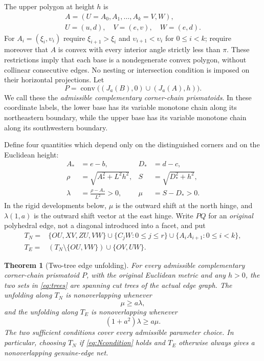 \documentclass[a4paper,11pt]{amsart}
\newtheorem{theorem}{Theorem}[section]
\begin{document}
The upper polygon at height $h$ is
\begin{equation}\label{eq:A}
\begin{gathered}
 A=(U=A_0,A_1,\ldots,A_k=V,W),\\
 U=(u,d),\quad V=(e,v),\quad W=(e,d).
\end{gathered}
\end{equation}
For $A_i=(\xi_i,\upsilon_i)$ require
$\xi_{i+1}>\xi_i$ and $\upsilon_{i+1}<\upsilon_i$ for $0\leq i<k$; require moreover that $A$ is convex with every interior angle strictly less than $\pi$. These restrictions imply that each base is a nondegenerate convex polygon, without collinear consecutive edges. No nesting or intersection condition is imposed on their horizontal projections. Let
\[
 P=\operatorname{conv}\bigl((J_a(B),0)\cup(J_a(A),h)\bigr).
\]
We call these the \emph{admissible complementary corner-chain prismatoids}.
In these coordinate labels, the lower base has its variable monotone chain along its northeastern boundary, while the upper base has its variable monotone chain along its southwestern boundary.

Define four quantities which depend only on the distinguished corners and on the Euclidean height:
\begin{align}\label{eq:parameters}
 A_*&=e-b,& D_*&=d-c,\\
 \rho&=\sqrt{A_*^2+L^2h^2},& S&=\sqrt{D_*^2+h^2},\\
 \lambda&=\frac{\rho-A_*}{L^2}>0,&
 \mu&=S-D_*>0.
\end{align}
In the rigid developments below, $\mu$ is the outward shift at the north hinge, and $\lambda(1,a)$ is the outward shift vector at the east hinge.
Write $PQ$ for an \emph{original} polyhedral edge, not a diagonal introduced into a facet, and put
\begin{align}\label{eq:trees}
 T_N={}&\{OU,XV,ZU,VW\}
 \cup\{C_jW:0\leq j\leq r\}
 \cup\{A_iA_{i+1}:0\leq i<k\},\\
 T_E={}&(T_N\setminus\{OU,VW\})\cup\{OV,UW\}.
\end{align}

\begin{theorem}[Two-tree edge unfolding]\label{thm:main}
For every admissible complementary corner-chain prismatoid $P$, with the original Euclidean metric and any $h>0$, the two sets in \eqref{eq:trees} are spanning cut trees of the actual edge graph. The unfolding along $T_N$ is nonoverlapping whenever
\begin{equation}\label{eq:Ncondition}
 \mu\geq a\lambda,
\end{equation}
and the unfolding along $T_E$ is nonoverlapping whenever
\begin{equation}\label{eq:Econdition}
 (1+a^2)\lambda\geq a\mu.
\end{equation}
The two sufficient conditions cover every admissible parameter choice. In particular, choosing $T_N$ if \eqref{eq:Ncondition} holds and $T_E$ otherwise always gives a nonoverlapping genuine-edge net.
\end{theorem}
\end{document}
